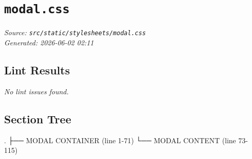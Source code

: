 
\section{\texttt{modal.css}}
\textit{Source: \texttt{src/static/stylesheets/modal.css}} \\
\textit{Generated: 2026-06-02 02:11} \\

\subsection{Lint Results}
\textit{No lint issues found.} \\

\subsection{Section Tree}
\begingroup
\linespread{0.9}\selectfont
\begin{verbnobox}[\FiraCode]
.
├── MODAL CONTAINER  (line 1-71)
└── MODAL CONTENT  (line 73-115)
\end{verbnobox}
\endgroup

